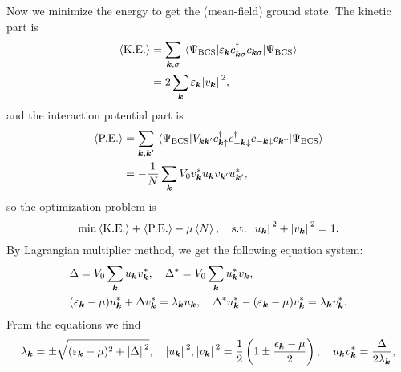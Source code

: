 \documentclass[hyperref, a4paper]{article}
\begin{document}
Now we minimize the energy to get the (mean-field) ground state. 
The kinetic part is 
\begin{equation}
    \begin{aligned}
        \expval{\text{K.E.}} &= \sum_{\vb*{k}, \sigma} 
        \expval{\varepsilon_{\vb*{k}} c^\dagger_{\vb*{k} \sigma} c_{\vb*{k} \sigma}}{\Psi_{\text{BCS}}} \\
        &= 2 \sum_{\vb*{k}} \varepsilon_{\vb*{k}} \abs*{v_{\vb*{k}}}^2,
    \end{aligned}
\end{equation}
and the interaction potential part is 
\begin{equation}
    \begin{aligned}
        \expval{\text{P.E.}} &= \sum_{\vb*{k}, \vb*{k}'} 
        \expval{
            V_{\vb*{k} \vb*{k}'} c^\dagger_{\vb*{k} \uparrow}
            c^\dagger_{- \vb*{k} \downarrow}
            c_{- \vb*{k} \downarrow}
            c_{\vb*{k} \uparrow}
        }{\Psi_{\text{BCS}}} \\
        &= - \frac{1}{N} \sum_{\vb*{k}} V_0 v^*_{\vb*{k}} u_{\vb*{k}} v_{\vb*{k}'} u_{\vb*{k}'}^*,
    \end{aligned}
\end{equation}
so the optimization problem is 
\begin{equation}
    \min \expval{\text{K.E.}} + \expval{\text{P.E.}} - \mu \expval{N}, 
    \quad \text{s.t. $\abs*{u_{\vb*{k}}}^2 + \abs*{v_{\vb*{k}}}^2 = 1$}.
\end{equation}
By Lagrangian multiplier method, 
we get the following equation system: 
\begin{equation}
    \begin{aligned}
        &\Delta = V_0 \sum_{\vb*{k}} u_{\vb*{k}} v^*_{\vb*{k}}, \quad 
        \Delta^* = V_0 \sum_{\vb*{k}} u_{\vb*{k}}^* v_{\vb*{k}}, \quad \\
        &(\varepsilon_{\vb*{k}} - \mu) u^*_{\vb*{k}} + \Delta v^*_{\vb*{k}} = \lambda_{\vb*{k}} u_{\vb*{k}}, \quad 
        \Delta^* u^*_{\vb*{k}} - (\varepsilon_{\vb*{k}} - \mu) v^*_{\vb*{k}} = \lambda_{\vb*{k}} v^*_{\vb*{k}}.
    \end{aligned}
\end{equation}
From the equations we find 
\begin{equation}
    \lambda_{\vb*{k}} = \pm \sqrt{
        (\varepsilon_{\vb*{k}} - \mu)^2 + \abs*{\Delta}^2
    }, \quad 
    \abs*{u_{\vb*{k}}}^2, \abs*{v_{\vb*{k}}}^2 = 
    \frac{1}{2} \left(
        1 \pm \frac{\epsilon_{\vb*{k}} - \mu}{2}
    \right), \quad 
    u_{\vb*{k}} v^*_{\vb*{k}} = \frac{\Delta}{2 \lambda_{\vb*{k}}},
\end{equation}
\end{document}
